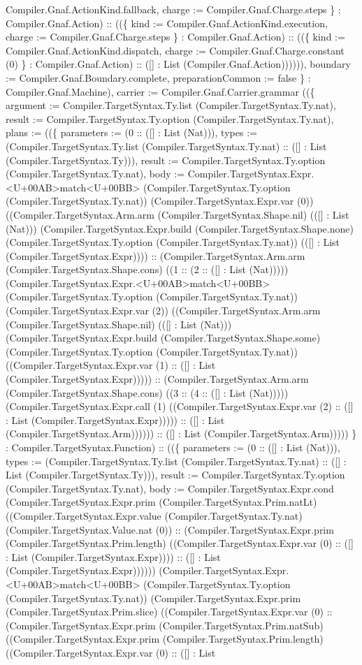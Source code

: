 \documentclass[11pt]{article}
\begin{document}
Compiler.Gnaf.ActionKind.fallback, charge := Compiler.Gnaf.Charge.steps \} : Compiler.Gnaf.Action) :: ((\{ kind := Compiler.Gnaf.ActionKind.execution, charge := Compiler.Gnaf.Charge.steps \} : Compiler.Gnaf.Action) :: ((\{ kind := Compiler.Gnaf.ActionKind.dispatch, charge := Compiler.Gnaf.Charge.constant (0) \} : Compiler.Gnaf.Action) :: ([] : List (Compiler.Gnaf.Action)))))), boundary := Compiler.Gnaf.Boundary.complete, preparationCommon := false \} : Compiler.Gnaf.Machine), carrier := Compiler.Gnaf.Carrier.grammar ((\{ argument := Compiler.TargetSyntax.Ty.list (Compiler.TargetSyntax.Ty.nat), result := Compiler.TargetSyntax.Ty.option (Compiler.TargetSyntax.Ty.nat), plans := ((\{ parameters := (0 :: ([] : List (Nat))), types := (Compiler.TargetSyntax.Ty.list (Compiler.TargetSyntax.Ty.nat) :: ([] : List (Compiler.TargetSyntax.Ty))), result := Compiler.TargetSyntax.Ty.option (Compiler.TargetSyntax.Ty.nat), body := Compiler.TargetSyntax.Expr.<U+00AB>match<U+00BB> (Compiler.TargetSyntax.Ty.option (Compiler.TargetSyntax.Ty.nat)) (Compiler.TargetSyntax.Expr.var (0)) ((Compiler.TargetSyntax.Arm.arm (Compiler.TargetSyntax.Shape.nil) (([] : List (Nat))) (Compiler.TargetSyntax.Expr.build (Compiler.TargetSyntax.Shape.none) (Compiler.TargetSyntax.Ty.option (Compiler.TargetSyntax.Ty.nat)) (([] : List (Compiler.TargetSyntax.Expr)))) :: (Compiler.TargetSyntax.Arm.arm (Compiler.TargetSyntax.Shape.cons) ((1 :: (2 :: ([] : List (Nat))))) (Compiler.TargetSyntax.Expr.<U+00AB>match<U+00BB> (Compiler.TargetSyntax.Ty.option (Compiler.TargetSyntax.Ty.nat)) (Compiler.TargetSyntax.Expr.var (2)) ((Compiler.TargetSyntax.Arm.arm (Compiler.TargetSyntax.Shape.nil) (([] : List (Nat))) (Compiler.TargetSyntax.Expr.build (Compiler.TargetSyntax.Shape.some) (Compiler.TargetSyntax.Ty.option (Compiler.TargetSyntax.Ty.nat)) ((Compiler.TargetSyntax.Expr.var (1) :: ([] : List (Compiler.TargetSyntax.Expr))))) :: (Compiler.TargetSyntax.Arm.arm (Compiler.TargetSyntax.Shape.cons) ((3 :: (4 :: ([] : List (Nat))))) (Compiler.TargetSyntax.Expr.call (1) ((Compiler.TargetSyntax.Expr.var (2) :: ([] : List (Compiler.TargetSyntax.Expr))))) :: ([] : List (Compiler.TargetSyntax.Arm)))))) :: ([] : List (Compiler.TargetSyntax.Arm))))) \} : Compiler.TargetSyntax.Function) :: ((\{ parameters := (0 :: ([] : List (Nat))), types := (Compiler.TargetSyntax.Ty.list (Compiler.TargetSyntax.Ty.nat) :: ([] : List (Compiler.TargetSyntax.Ty))), result := Compiler.TargetSyntax.Ty.option (Compiler.TargetSyntax.Ty.nat), body := Compiler.TargetSyntax.Expr.cond (Compiler.TargetSyntax.Expr.prim (Compiler.TargetSyntax.Prim.natLt) ((Compiler.TargetSyntax.Expr.value (Compiler.TargetSyntax.Ty.nat) (Compiler.TargetSyntax.Value.nat (0)) :: (Compiler.TargetSyntax.Expr.prim (Compiler.TargetSyntax.Prim.length) ((Compiler.TargetSyntax.Expr.var (0) :: ([] : List (Compiler.TargetSyntax.Expr)))) :: ([] : List (Compiler.TargetSyntax.Expr)))))) (Compiler.TargetSyntax.Expr.<U+00AB>match<U+00BB> (Compiler.TargetSyntax.Ty.option (Compiler.TargetSyntax.Ty.nat)) (Compiler.TargetSyntax.Expr.prim (Compiler.TargetSyntax.Prim.slice) ((Compiler.TargetSyntax.Expr.var (0) :: (Compiler.TargetSyntax.Expr.prim (Compiler.TargetSyntax.Prim.natSub) ((Compiler.TargetSyntax.Expr.prim (Compiler.TargetSyntax.Prim.length) ((Compiler.TargetSyntax.Expr.var (0) :: ([] : List 
\end{document}
